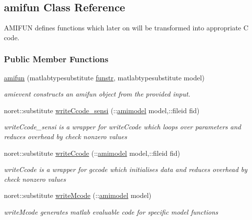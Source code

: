 \hypertarget{classamifun}{}\subsection{amifun Class Reference}
\label{classamifun}


A\+M\+I\+F\+UN defines functions which later on will be transformed into appropriate C code.  


\subsubsection*{Public Member Functions}
\begin{DoxyCompactItemize}
\item 
\mbox{\hyperlink{classamifun_a609e744c18813bc24f360b8cc5150344}{amifun}} (matlabtypesubstitute \mbox{\hyperlink{classamifun_a484b54379bc8b29b6ce65d84966ea4c4}{funstr}}, matlabtypesubstitute model)
\begin{DoxyCompactList}\small\item\em amievent constructs an amifun object from the provided input. \end{DoxyCompactList}\item 
noret\+::substitute \mbox{\hyperlink{classamifun_a7845c1193d9a963f7bb9802f1eeefac7}{write\+Ccode\+\_\+sensi}} (\+::\mbox{\hyperlink{classamimodel}{amimodel}} model,\+::fileid fid)
\begin{DoxyCompactList}\small\item\em write\+Ccode\+\_\+sensi is a wrapper for write\+Ccode which loops over parameters and reduces overhead by check nonzero values \end{DoxyCompactList}\item 
noret\+::substitute \mbox{\hyperlink{classamifun_a8e48f2842268ff64ca32db8eb4b69377}{write\+Ccode}} (\+::\mbox{\hyperlink{classamimodel}{amimodel}} model,\+::fileid fid)
\begin{DoxyCompactList}\small\item\em write\+Ccode is a wrapper for gccode which initialises data and reduces overhead by check nonzero values \end{DoxyCompactList}\item 
noret\+::substitute \mbox{\hyperlink{classamifun_a9b041ce0ffcfab125b5db3ed5ca847a2}{write\+Mcode}} (\+::\mbox{\hyperlink{classamimodel}{amimodel}} model)
\begin{DoxyCompactList}\small\item\em write\+Mcode generates matlab evaluable code for specific model functions \end{DoxyCompactList}\item 

\end{DoxyCompactItemize}

